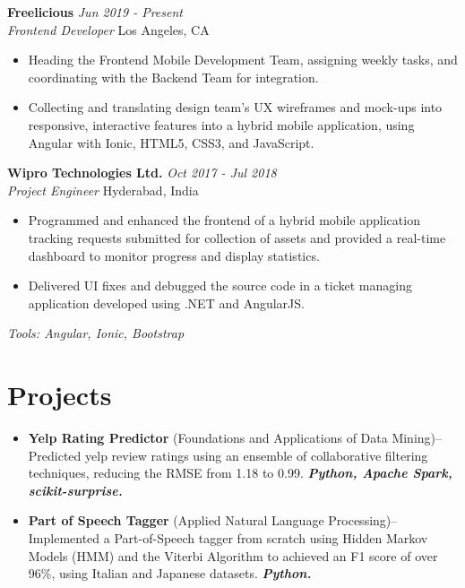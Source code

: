 \documentclass[letterpaper,10pt]{article}
\newcommand{\organization}[4]{
    \vspace{1.5pt}
    \textbf{#1} \hfill{\emph{#2}} \\
    \emph{#3} \hfill{#4} \\
    \vspace{3pt}
}
\newcommand{\pro}[4]{
    \item \textbf{#1} {#2}--{#3} \textbf{\textit{#4}}
}
\newcommand{\bulletsBegin}{
    \vspace{1pt}
    \begin{minipage}{17.6cm}
    \begin{itemize}[leftmargin=0.6cm]
    \setlength\itemsep{-0.1em}
}
\newcommand{\bulletsEnd}{
    \end{itemize}\vspace{0pt}
    \end{minipage}
}
\begin{document}
        \organization{Freelicious}{Jun 2019 - Present}
        {Frontend Developer}{Los Angeles, CA}
        \bulletsBegin
            \item Heading the Frontend Mobile Development Team, assigning weekly tasks, and coordinating with the Backend Team for integration.
            \vspace{-2pt}
            \item Collecting and translating design team's UX wireframes and mock-ups into responsive, interactive features into a hybrid mobile application, using Angular with Ionic, HTML5, CSS3, and JavaScript.
        \bulletsEnd

        \organization{Wipro Technologies Ltd.}{Oct 2017 - Jul 2018}
        {Project Engineer}{Hyderabad, India}
        \bulletsBegin
            \item Programmed and enhanced the frontend of a hybrid mobile application tracking requests submitted for collection of assets and provided a real-time dashboard to monitor progress and display statistics.
            \vspace{-2pt}
            \item Delivered UI fixes and debugged the source code in a ticket managing application developed using .NET and AngularJS.
        \bulletsEnd
        \vspace{-10pt}
        \textit{Tools: Angular, Ionic, Bootstrap}

    \section{Projects}

    
        \bulletsBegin
            \vspace{-3pt}
        \pro{Yelp Rating Predictor}{(Foundations and Applications of Data Mining)}
            {Predicted yelp review ratings using an ensemble of collaborative filtering techniques, reducing the RMSE from 1.18 to 0.99.}
            {Python, Apache Spark, scikit-surprise.}
        \pro{Part of Speech Tagger}{(Applied Natural Language Processing)}
            {Implemented a Part-of-Speech tagger from scratch using Hidden Markov Models (HMM) and the Viterbi Algorithm to achieved an F1 score of over 96\%, using Italian and Japanese datasets.}
            {Python.}
        
        \bulletsEnd
\end{document}
